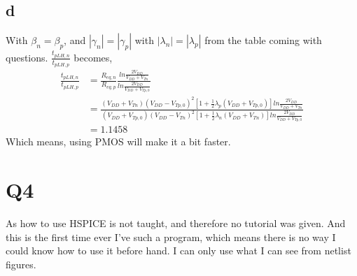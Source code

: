 \documentclass[a4paper,10pt]{article}
\begin{document}
\subsection*{d}
With \begin{math}\beta_n = \beta_p\end{math}, and \begin{math}|\gamma_n| = |\gamma_p|\end{math} with 
\begin{math}|\lambda_n| = |\lambda_p|\end{math} from the table coming with questions.
\begin{math}\frac{t_{pLH, n}}{t_{pLH, p}}\end{math} becomes,
\begin{equation}
 \begin{split}
  \frac{t_{pLH, n}}{t_{pLH, p}} &= \frac{R_{eq, n}}{R_{eq, p}}\frac{ln\frac{2V_{DD}}{V_{DD} + V_{Tn}}}{ln\frac{2V_{DD}}{V_{DD} + 
  V_{Tp, 0}}} \\
  &= \frac{(V_{DD}+V_{Tn})(V_{DD}-V_{Tp, 0})^2 [1+\frac{1}{2}\lambda_p(V_{DD}+V_{Tp, 0})]ln\frac{2V_{DD}}{V_{DD} + V_{Tn}}}
  {(V_{DD}+V_{Tp, 0})(V_{DD}-V_{Tn})^2 [1+\frac{1}{2}\lambda_n(V_{DD}+V_{Tn})]ln\frac{2V_{DD}}{V_{DD} + V_{Tp, 0}}}\\
  &=1.1458
 \end{split}
\end{equation}
Which means, using PMOS will make it a bit faster.
\section*{Q4}
As how to use HSPICE is not taught, and therefore no tutorial was given. And this is the first time ever I've such a program, which
means there is no way I could know how to use it before hand. I can only use what I can see from netlist figures.
\end{document}
